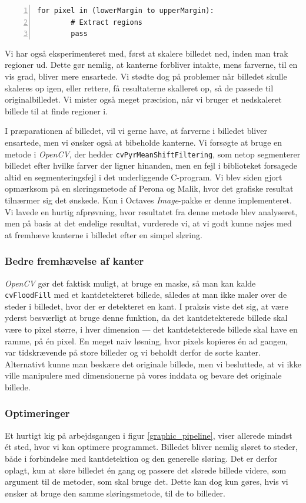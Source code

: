 {\begin{lstlisting}[caption={Pseudokode til udtrækning af regioner med
    margin.},captionpos=b,label={pseudo_fix},numbers=left,
    frame=tb, breaklines=false, float=h]
    for pixel in (lowerMargin to upperMargin):
        # Extract regions
        pass
\end{lstlisting}

Vi har også eksperimenteret med, først at skalere billedet ned, inden
man trak regioner ud. Dette gør nemlig, at kanterne forbliver intakte,
mens farverne, til en vis grad, bliver mere ensartede. Vi stødte dog på
problemer når billedet skulle skaleres op igen, eller rettere, få
resultaterne skalleret op, så de passede til originalbilledet. Vi mister
også meget præcision, når vi bruger et nedskaleret billede til at finde
regioner i.


I præparationen af billedet, vil vi gerne have, at farverne i billedet
bliver ensartede, men vi ønsker også at bibeholde kanterne. Vi forsøgte
at bruge en metode i \emph{OpenCV}, der hedder
\texttt{cvPyrMeanShiftFiltering}, som netop segmenterer billedet efter
hvilke farver der ligner hinanden, men en fejl i biblioteket forsagede
altid en segmenteringsfejl i det underliggende C-program. Vi blev siden
gjort opmærksom på en sløringsmetode af Perona og
Malik\cite{perona1990scale}, hvor det grafiske resultat tilnærmer sig
det ønskede. Kun i Octaves \emph{Image}-pakke er denne implementeret. Vi
lavede en hurtig afprøvning, hvor resultatet fra denne metode blev
analyseret, men på basis at det endelige resultat, vurderede vi, at vi
godt kunne nøjes med at fremhæve kanterne i billedet efter en simpel
sløring.

\subsubsection{Bedre fremhævelse af kanter}

\emph{OpenCV} gør det faktisk muligt, at bruge en maske, så man kan
kalde \texttt{cvFloodFill} med et kantdetekteret billede, således at man
ikke maler over de steder i billedet, hvor der er detekteret en kant. I
praksis viste det sig, at være yderst besværligt at bruge denne
funktion, da det kantdetekterede billede skal være to pixel større, i
hver dimension --- det kantdetekterede billede skal have en ramme, på én
pixel. En meget naiv løsning, hvor pixels kopieres én ad gangen, var
tidskrævende på store billeder og vi beholdt derfor de sorte kanter.
Alternativt kunne man beskære det originale billede, men vi besluttede,
at vi ikke ville manipulere med dimensionerne på vores inddata og bevare
det originale billede.

\subsubsection{Optimeringer}
Et hurtigt kig på arbejdsgangen i figur \ref{graphic_pipeline}, viser
allerede mindst ét sted, hvor vi kan optimere programmet. Billedet bliver
nemlig sløret to steder, både i forbindelse med kantdetektion og den
generelle sløring. Det er derfor oplagt, kun at sløre billedet én gang
og passere det slørede billede videre, som argument til de metoder, som
skal bruge det. Dette kan dog kun gøres, hvis vi ønsker at bruge den
samme sløringsmetode, til de to billeder.

}
